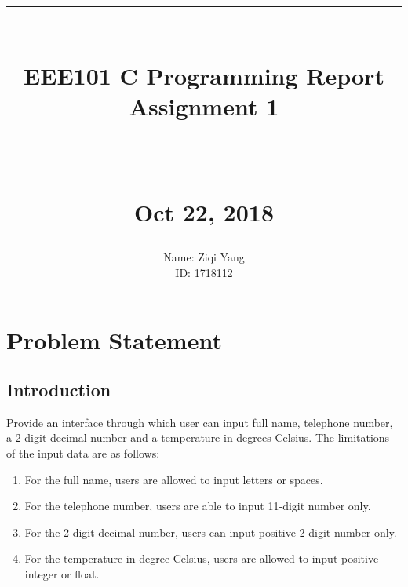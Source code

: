 \documentclass[12pt]{article}
\newcommand{\HRule}[1]{\rule{\linewidth}{#1}}
\begin{document}
	
	\title{ \normalsize \textsc{}
		\\ [2.0cm]
		\HRule{0.5pt} \\
		\LARGE \textbf{EEE101 C Programming Report\\Assignment 1}
		\HRule{2pt} \\ [0.5cm]
		\normalsize Oct 22, 2018 \vspace*{5\baselineskip}}
	
	\date{}
	
	\author{
		Name: Ziqi Yang\\
		ID: 1718112\\
	}
	
	\maketitle
	\newpage
	\tableofcontents
	\newpage
	
	
	\section{Problem Statement}
	
	\subsection{Introduction}
	Provide an interface through which user can input full name, telephone number, a 2-digit decimal number and a temperature in degrees Celsius. The limitations of the input data are as follows:
	
	\begin{enumerate}
	\item For the full name, users are allowed to input letters or spaces.
	\item For the telephone number, users are able to input 11-digit number only.
	\item For the 2-digit decimal number, users can input positive 2-digit number only.
	\item For the temperature in degree Celsius, users are allowed to input positive integer or float.
	\end{enumerate}
\end{document}
